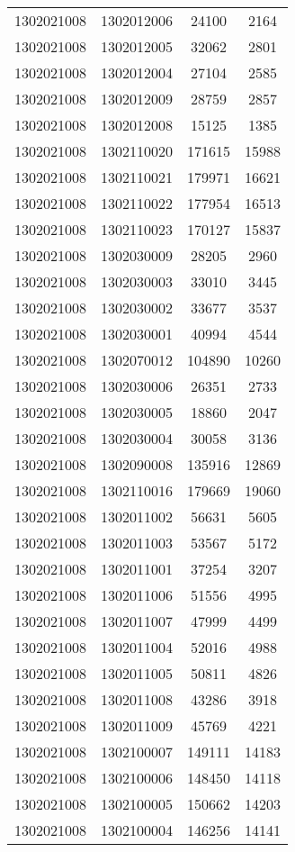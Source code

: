 \begin{longtable}{llcc}
1302021008 & 1302012006 & 24100 & 2164\\
1302021008 & 1302012005 & 32062 & 2801\\
1302021008 & 1302012004 & 27104 & 2585\\
1302021008 & 1302012009 & 28759 & 2857\\
1302021008 & 1302012008 & 15125 & 1385\\
1302021008 & 1302110020 & 171615 & 15988\\
1302021008 & 1302110021 & 179971 & 16621\\
1302021008 & 1302110022 & 177954 & 16513\\
1302021008 & 1302110023 & 170127 & 15837\\
1302021008 & 1302030009 & 28205 & 2960\\
1302021008 & 1302030003 & 33010 & 3445\\
1302021008 & 1302030002 & 33677 & 3537\\
1302021008 & 1302030001 & 40994 & 4544\\
1302021008 & 1302070012 & 104890 & 10260\\
1302021008 & 1302030006 & 26351 & 2733\\
1302021008 & 1302030005 & 18860 & 2047\\
1302021008 & 1302030004 & 30058 & 3136\\
1302021008 & 1302090008 & 135916 & 12869\\
1302021008 & 1302110016 & 179669 & 19060\\
1302021008 & 1302011002 & 56631 & 5605\\
1302021008 & 1302011003 & 53567 & 5172\\
1302021008 & 1302011001 & 37254 & 3207\\
1302021008 & 1302011006 & 51556 & 4995\\
1302021008 & 1302011007 & 47999 & 4499\\
1302021008 & 1302011004 & 52016 & 4988\\
1302021008 & 1302011005 & 50811 & 4826\\
1302021008 & 1302011008 & 43286 & 3918\\
1302021008 & 1302011009 & 45769 & 4221\\
1302021008 & 1302100007 & 149111 & 14183\\
1302021008 & 1302100006 & 148450 & 14118\\
1302021008 & 1302100005 & 150662 & 14203\\
1302021008 & 1302100004 & 146256 & 14141\\

\end{longtable}
